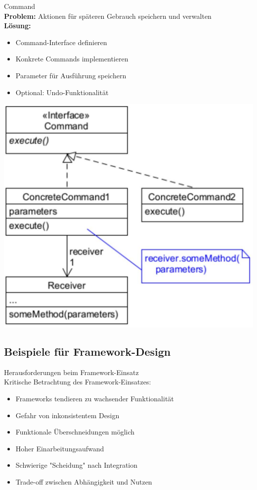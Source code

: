 \begin{concept}{Command}\\
\textbf{Problem:} Aktionen für späteren Gebrauch speichern und verwalten\\
\textbf{Lösung:}
\begin{itemize}
    \item Command-Interface definieren
    \item Konkrete Commands implementieren
    \item Parameter für Ausführung speichern
    \item Optional: Undo-Funktionalität
\end{itemize}
\includegraphics[width=0.7\linewidth]{images/2025_01_02_73d93f10fa91ab6123dcg-19}
\end{concept}


\subsection{Beispiele für Framework-Design}

\begin{KR}{Herausforderungen beim Framework-Einsatz}\\
Kritische Betrachtung des Framework-Einsatzes:
\begin{itemize}
    \item Frameworks tendieren zu wachsender Funktionalität
    \item Gefahr von inkonsistentem Design
    \item Funktionale Überschneidungen möglich
    \item Hoher Einarbeitungsaufwand
    \item Schwierige "Scheidung" nach Integration
    \item Trade-off zwischen Abhängigkeit und Nutzen
\end{itemize}
\end{KR}

